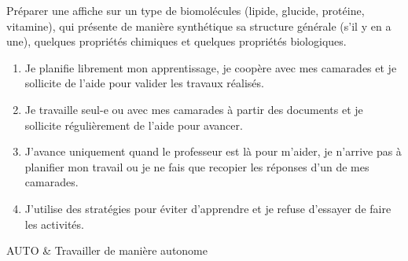 \begin{programmeSeance}
\end{programmeSeance}
\vspace*{1.2 cm}

\begin{programmeSeance}[1]
\end{programmeSeance}


\begin{tacheFinale}
  Préparer une affiche  sur un type de biomolécules (lipide, glucide, protéine, vitamine), qui présente de manière synthétique sa structure générale  (s'il y en a une), quelques propriétés chimiques et quelques propriétés biologiques.
\end{tacheFinale}




\begin{enumerate}[label = \Alph*]
  \item Je planifie librement mon apprentissage, je coopère avec mes camarades et je sollicite de l'aide pour valider les travaux réalisés.
  \item Je travaille seul-e ou avec mes camarades à partir des documents et je sollicite régulièrement de l'aide pour avancer.
  \item J'avance uniquement quand le professeur est là pour m'aider, je n'arrive pas à planifier mon travail ou je ne fais que recopier les réponses d'un de mes camarades.
  \item J'utilise des stratégies pour éviter d'apprendre et je refuse d'essayer de faire les activités.
\end{enumerate}

\begin{tableauCompetences}
  AUTO & Travailler de manière autonome  \\
\end{tableauCompetences}